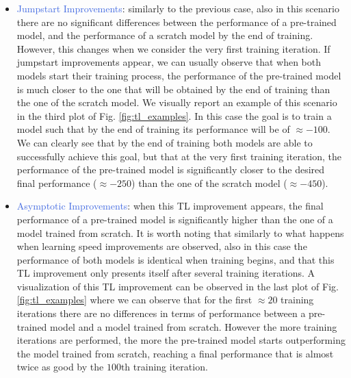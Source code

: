 \begin{itemize}
	\item \textcolor{RoyalBlue}{Jumpstart Improvements}: similarly to the previous case, also in this scenario there are no significant differences between the performance of a pre-trained model, and the performance of a scratch model by the end of training. However, this changes when we consider the very first training iteration. If jumpstart improvements appear, we can usually observe that when both models start their training process, the performance of the pre-trained model is much closer to the one that will be obtained by the end of training than the one of the scratch model. We visually report an example of this scenario in the third plot of Fig. \ref{fig:tl_examples}. In this case the goal is to train a model such that by the end of training its performance will be of $\approx -100$. We can clearly see that by the end of training both models are able to successfully achieve this goal, but that at the very first training iteration, the performance of the pre-trained model is significantly closer to the desired final performance ($\approx -250$) than the one of the scratch model ($\approx -450$). 
	\item \textcolor{RoyalBlue}{Asymptotic Improvements}: when this TL improvement appears, the final performance of a pre-trained model is significantly higher than the one of a model trained from scratch. It is worth noting that similarly to what happens when learning speed improvements are observed, also in this case the performance of both models is identical when training begins, and that this TL improvement only presents itself after several training iterations. A visualization of this TL improvement can be observed in the last plot of Fig. \ref{fig:tl_examples} where we can observe that for the first $\approx 20$ training iterations there are no differences in terms of performance between a pre-trained model and a model trained from scratch. However the more training iterations are performed, the more the pre-trained model starts outperforming the model trained from scratch, reaching a final performance that is almost twice as good by the $100\text{th}$ training iteration.
\end{itemize}



